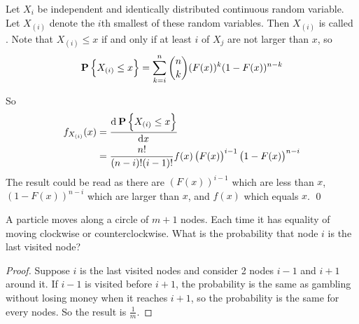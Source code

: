 \begin{example}
    Let $X_i$ be independent and identically distributed continuous random variable. Let $X_{(i)}$ denote the $i$th smallest of these random variables. Then $X_{(i)}$ is called . Note that $X_{(i)} \leq x$ if and only if at least $i$ of $X_j$ are not larger than $x$, so
    \begin{equation*}
        \mathop{\bf P\/}\left\{X_{(i)} \leq x\right\} = \sum_{k=i}^n \binom{n}{k} (F(x))^k (1 - F(x))^{n-k}
    \end{equation*}
    
    So
    \begin{equation*}
        \begin{aligned}
            f_{X_{(i)}} (x) &= \dod{\probability{X_{(i)} \leq x}}{x} \\
            &= \frac{n!}{(n-i)!(i-1)!} f(x) \left( F(x) \right)^{i-1} \left(1-F(x) \right)^{n-i}
        \end{aligned}
    \end{equation*}
    The result could be read as there are $\left( F(x) \right)^{i-1}$ which are less than $x$, $\left(1-F(x) \right)^{n-i}$ which are larger than $x$, and $f(x)$ which equals $x$. \qed
\end{example}

\begin{example}
A particle moves along a circle of $m+1$ nodes. Each time it has equality of moving clockwise or counterclockwise. What is the probability that node $i$ is the last visited node?    
\end{example}
\begin{proof}
    Suppose $i$ is the last visited nodes and consider 2 nodes $i-1$ and $i+1$ around it. If $i-1$ is visited before $i+1$, the probability is the same as gambling without losing money when it reaches $i+1$, so the probability is the same for every nodes. So the result is $\displaystyle \frac{1}{m}$.
\end{proof}



